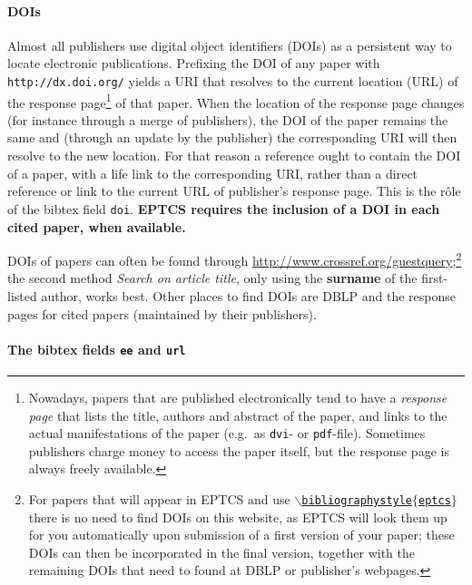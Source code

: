 \documentclass[submission,copyright,creativecommons]{eptcs}
\begin{document}
\paragraph{DOIs}

Almost all publishers use digital object identifiers (DOIs) as a
persistent way to locate electronic publications. Prefixing the DOI of
any paper with {\tt http://dx.doi.org/} yields a URI that resolves to the
current location (URL) of the response page\footnote{Nowadays, papers
  that are published electronically tend
  to have a \emph{response page} that lists the title, authors and
  abstract of the paper, and links to the actual manifestations of
  the paper (e.g.\ as {\tt dvi}- or {\tt pdf}-file). Sometimes
  publishers charge money to access the paper itself, but the response
  page is always freely available.}
of that paper. When the location of the response page changes (for
instance through a merge of publishers), the DOI of the paper remains
the same and (through an update by the publisher) the corresponding
URI will then resolve to the new location. For that reason a reference
ought to contain the DOI of a paper, with a life link to the corresponding
URI, rather than a direct reference or link to the current URL of
publisher's response page. This is the r\^ole of the bibtex field {\tt doi}.
{\bf EPTCS requires the inclusion of a DOI in each cited paper, when available.}

DOIs of papers can often be found through
\url{http://www.crossref.org/guestquery};\footnote{For papers that will appear
  in EPTCS and use \href{http://eptcs.web.cse.unsw.edu.au/eptcs.bst}
  {\tt $\backslash$bibliographystyle$\{$eptcs$\}$} there is no need to
  find DOIs on this website, as EPTCS will look them up for you
  automatically upon submission of a first version of your paper;
  these DOIs can then be incorporated in the final version, together
  with the remaining DOIs that need to found at DBLP or publisher's webpages.}
the second method {\it Search on article title}, only using the {\bf
surname} of the first-listed author, works best.  
Other places to find DOIs are DBLP and the response pages for cited
papers (maintained by their publishers).

\paragraph{The bibtex fields {\tt ee} and {\tt url}}
\end{document}
